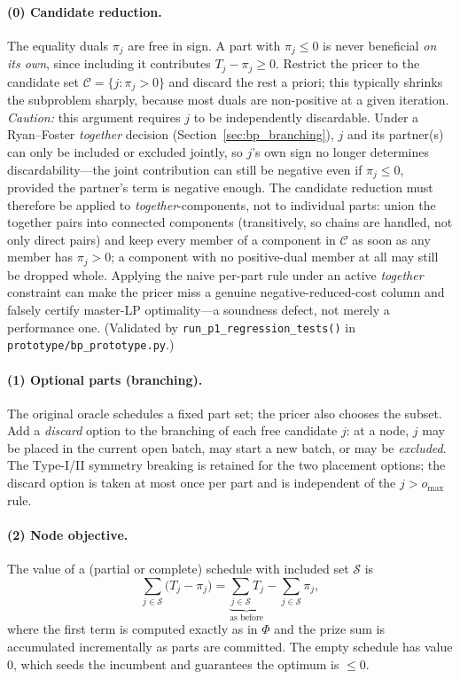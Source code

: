 \documentclass[review,3p,times,authoryear]{elsarticle}
\begin{document}
\paragraph{(0) Candidate reduction.} The equality duals $\pi_j$ are free in sign.
A part with $\pi_j\le 0$ is never beneficial \emph{on its own}, since including it
contributes $T_j-\pi_j\ge 0$. Restrict the pricer to the candidate set
$\mathcal{C}=\{j:\pi_j>0\}$ and discard the rest a priori; this typically shrinks
the subproblem sharply, because most duals are non-positive at a given iteration.
\emph{Caution:} this argument requires $j$ to be independently discardable. Under a
Ryan--Foster \emph{together} decision (Section~\ref{sec:bp_branching}), $j$ and its
partner(s) can only be included or excluded jointly, so $j$'s own sign no longer
determines discardability---the joint contribution can still be negative even if
$\pi_j\le 0$, provided the partner's term is negative enough. The candidate
reduction must therefore be applied to \emph{together}-components, not to
individual parts: union the together pairs into connected components (transitively,
so chains are handled, not only direct pairs) and keep every member of a component
in $\mathcal{C}$ as soon as any member has $\pi_j>0$; a component with no
positive-dual member at all may still be dropped whole. Applying the naive
per-part rule under an active \emph{together} constraint can make the pricer miss a
genuine negative-reduced-cost column and falsely certify master-LP optimality---a
soundness defect, not merely a performance one. (Validated by
\texttt{run\_p1\_regression\_tests()} in \texttt{prototype/bp\_prototype.py}.)

\paragraph{(1) Optional parts (branching).} The original oracle schedules a fixed
part set; the pricer also chooses the subset. Add a \emph{discard} option to the
branching of each free candidate $j$: at a node, $j$ may be placed in the current
open batch, may start a new batch, or may be \emph{excluded}. The Type-I/II
symmetry breaking is retained for the two placement options; the discard option is
taken at most once per part and is independent of the $j>o_{\max}$ rule.

\paragraph{(2) Node objective.} The value of a (partial or complete) schedule with
included set $\mathcal{S}$ is
\[
\sum_{j\in\mathcal{S}}\bigl(T_j-\pi_j\bigr)
=\underbrace{\textstyle\sum_{j\in\mathcal{S}}T_j}_{\text{as before}}
-\sum_{j\in\mathcal{S}}\pi_j ,
\]
where the first term is computed exactly as in $\Phi$ and the prize sum is
accumulated incrementally as parts are committed. The empty schedule has value
$0$, which seeds the incumbent and guarantees the optimum is $\le 0$.
\end{document}
